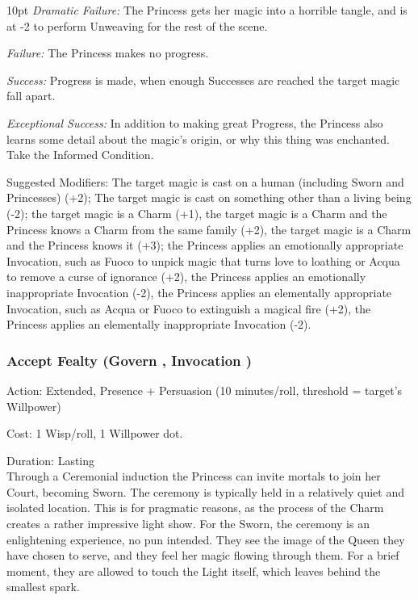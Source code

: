 \begin{myindentpar}{10pt}    \emph{Dramatic Failure:} The Princess gets her magic into a horrible tangle, and is at -2 to perform Unweaving for the rest of the scene.

    \emph{Failure:} The Princess makes no progress.
    
    \emph{Success:} Progress is made, when enough Successes are reached the target magic fall apart.
    
    \emph{Exceptional Success:} In addition to making great Progress, the Princess also learns some detail about the magic's origin, or why this thing was enchanted. Take the Informed Condition.
    
    Suggested Modifiers: The target magic is cast on a human (including Sworn and Princesses) (+2); The target magic is cast on something other than a living being (-2); the target magic is a Charm (+1), the target magic is a Charm and the Princess knows a Charm from the same family (+2), the target magic is a Charm and the Princess knows it (+3); the Princess applies an emotionally appropriate Invocation, such as Fuoco to unpick magic that turns love to loathing or Acqua to remove a curse of ignorance (+2), the Princess applies an emotionally inappropriate Invocation (-2), the Princess applies an elementally appropriate Invocation, such as Acqua or Fuoco to extinguish a magical fire (+2), the Princess applies an elementally inappropriate Invocation (-2).\end{myindentpar}

\subsubsection*{Accept Fealty (Govern \textbullet\textbullet\textbullet\textbullet, Invocation \textbullet\textbullet\textbullet)}

\noindent Action: Extended, Presence + Persuasion (10 minutes/roll, threshold = target's Willpower)

\noindent Cost: 1 Wisp/roll, 1 Willpower dot.

\noindent Duration: Lasting \\

\noindent Through a Ceremonial induction the Princess can invite mortals to join her Court, becoming Sworn. The ceremony is typically held in a relatively quiet and isolated location. This is for pragmatic reasons, as the process of the Charm creates a rather impressive light show. For the Sworn, the ceremony is an enlightening experience, no pun intended. They see the image of the Queen they have chosen to serve, and they feel her magic flowing through them. For a brief moment, they are allowed to touch the Light itself, which leaves behind the smallest spark.

